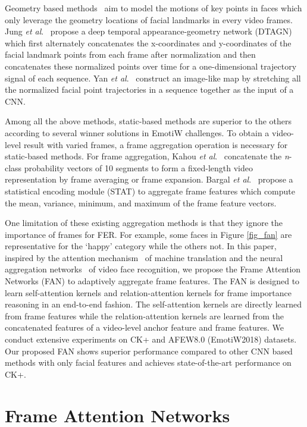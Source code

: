 \documentclass{article}
\begin{document}
Geometry based methods~\cite{Jung2015Joint,Yan2018Multi} aim to model the motions of key points in faces which only leverage the geometry locations of facial landmarks in every video frames. Jung \textit{et al}.~\cite{Jung2015Joint} propose a deep temporal appearance-geometry network (DTAGN) which first alternately concatenates the x-coordinates and y-coordinates of the facial landmark points from each frame after normalization and then concatenates these normalized points over time for a one-dimensional trajectory signal of each sequence. Yan \textit{et al}.~\cite{Yan2018Multi} construct an image-like map by stretching all the normalized facial point trajectories in a sequence together as the input of a CNN. 

 Among all the above methods, static-based methods are superior to the others according to several winner solutions in EmotiW challenges.  
To obtain a video-level result with varied frames, a frame aggregation operation is necessary for static-based methods. For frame aggregation, Kahou \textit{et al}.~\cite{Kahou2013Combining} concatenate the \textit{n}-class probability vectors of 10 segments to form a fixed-length video representation by frame averaging or frame expansion. 
Bargal \textit{et al}.~\cite{Bargal2016Emotion} propose a statistical encoding module (STAT) to aggregate frame features which compute the mean, variance, minimum, and maximum of the frame feature vectors. 

One limitation of these existing aggregation methods is that they ignore the importance of frames for FER. For example, some faces in Figure \ref{fig_fan} are representative for the `happy' category while the others not.
In this paper, inspired by the attention mechanism~\cite{vaswani2017attention} of machine translation and the neural aggregation networks~\cite{yang2017neural} of video face recognition, we propose the Frame Attention Networks (FAN) to adaptively aggregate frame features.
The FAN is designed to learn self-attention kernels and relation-attention kernels for frame importance reasoning in an end-to-end fashion. The self-attention kernels are directly learned from frame features while the relation-attention kernels are learned from the concatenated features of a video-level anchor feature and frame features.
We conduct extensive experiments on CK+ and AFEW8.0 (EmotiW2018) datasets. Our proposed FAN shows superior performance compared to other CNN based methods with only facial features and achieves state-of-the-art performance on CK+.

\section{Frame Attention Networks}
\label{sec:Frame Attention Networks}
\end{document}
